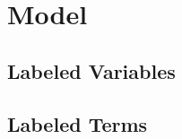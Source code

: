 \section{Model}\label{sec:model}

\subsection{Labeled Variables}\label{subsec:labeled_variables}

\subsection{Labeled Terms}\label{subsec:labeled_terms}
